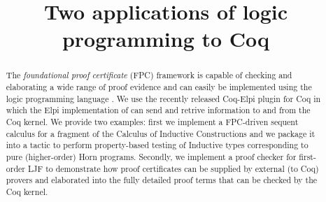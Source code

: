 \documentclass[a4paper,USenglish,cleveref, autoref, thm-restate]{lipics-v2019}
\title{Two applications of logic programming to Coq} %
\begin{document}
\maketitle

\begin{abstract}
The \emph{foundational proof certificate} (FPC) framework is capable
of checking and elaborating a wide range of proof evidence and can easily
be implemented using the logic programming language \lP.
%
%
We use the recently released Coq-Elpi plugin for Coq in which the Elpi
implementation of \lP can send and retrive information to and from the Coq kernel.
%
We provide two examples: first we implement a FPC-driven sequent calculus for a fragment of the Calculus of Inductive Constructions and we package it into a tactic to perform property-based testing of Inductive types corresponding to pure (higher-order) Horn programs. Secondly, we implement a proof checker for first-order LJF to demonstrate how  proof certificates
can be supplied by external (to Coq) provers and elaborated into the
fully detailed proof terms that can be checked by the Coq kernel.
\end{abstract}









\appendix

\end{document}
